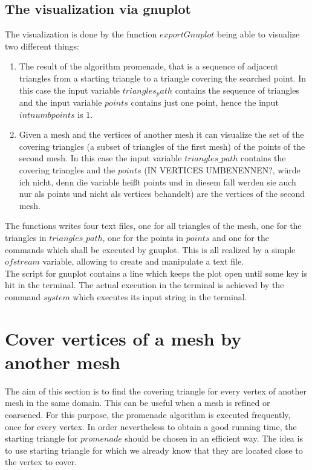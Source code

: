 \documentclass[10pt]{article}
\begin{document}
\subsection{The visualization via gnuplot}
	The visualization is done by the function $ exportGnuplot $ being able to visualize two different things: 
	\begin{enumerate}
		\item 
		The result of the algorithm promenade, that is a sequence of adjacent triangles from a starting triangle to a triangle covering the searched point. 
		In this case the input variable $ triangles_path $ contains the sequence of triangles and the input variable $  points $ contains just one point, hence the input $ int numbpoints $ is $ 1 $. 
		\item 
		Given a mesh and the vertices of another mesh it can visualize the set of the covering triangles (a subset of triangles of the first mesh) of the points of the second mesh. 
		In this case the input variable $ triangles\_path $ contains the covering triangles and the $ points $ (IN VERTICES UMBENENNEN?, würde ich nicht, denn die variable heißt points und in diesem fall werden sie auch nur als points und nicht als vertices behandelt) are the vertices of the second mesh. 
	\end{enumerate}
The functions writes four text files, one for all triangles of the mesh, one for the triangles in $ triangles\_path $, one for the points in $ points $ and one for the commands which shall be executed by gnuplot. This is all realized by a simple $ ofstream $ variable, allowing to create and manipulate a text file. \\
The script for gnuplot contains a line which keeps the plot open until some key is hit in the terminal. 
The actual execution in the terminal is achieved by the command $ system $ which executes its input string in the terminal. 

\section{Cover vertices of a mesh by another mesh}

The aim of this section is to find the covering triangle for every vertex of another mesh in the same domain. This can be useful when a mesh is refined or coarsened. For this purpose, the promenade algorithm is executed frequently, once for every vertex. In order nevertheless to obtain a good running time, the starting triangle for $promenade$ should be chosen in an efficient way. The idea is to use starting triangle for which we already know that they are located close to the vertex to cover.
\end{document}
